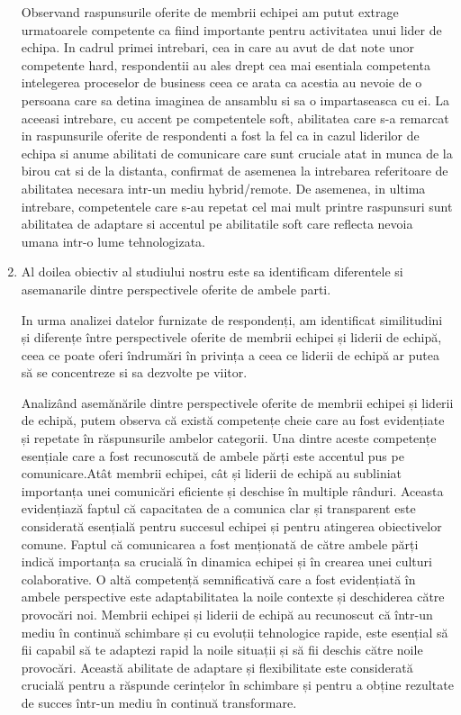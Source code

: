 \documentclass[a4paper, 12pt]{article}
\begin{document}
\begin{enumerate}[(1)]
	\quad Observand raspunsurile oferite de membrii echipei am putut extrage urmatoarele competente ca fiind importante pentru activitatea unui lider de echipa. In cadrul primei intrebari, cea in care au avut de dat note unor competente hard, respondentii au ales drept cea mai esentiala competenta intelegerea proceselor de business ceea ce arata ca acestia au nevoie de o persoana care sa detina imaginea de ansamblu si sa o impartaseasca cu ei. La aceeasi intrebare, cu accent pe competentele soft, abilitatea care s-a remarcat in raspunsurile oferite de respondenti a fost la fel ca in cazul liderilor de echipa si anume abilitati de comunicare care sunt cruciale atat in munca de la birou cat si de la distanta, confirmat de asemenea la intrebarea referitoare de abilitatea necesara intr-un mediu hybrid/remote. De asemenea, in ultima intrebare, competentele care s-au repetat cel mai mult printre raspunsuri sunt abilitatea de adaptare si accentul pe abilitatile soft care reflecta nevoia umana intr-o lume tehnologizata.

	\item Al doilea obiectiv al studiului nostru este sa identificam diferentele si asemanarile dintre perspectivele oferite de ambele parti.

	\quad In urma analizei datelor furnizate de respondenți, am identificat similitudini și diferențe între perspectivele oferite de membrii echipei și liderii de echipă, ceea ce poate oferi îndrumări în privința a ceea ce liderii de echipă ar putea să se concentreze si sa dezvolte pe viitor.

	\quad Analizând asemănările dintre perspectivele oferite de membrii echipei și liderii de echipă, putem observa că există competențe cheie care au fost evidențiate și repetate în răspunsurile ambelor categorii. Una dintre aceste competențe esențiale care a fost recunoscută de ambele părți este accentul pus pe comunicare.Atât membrii echipei, cât și liderii de echipă au subliniat importanța unei comunicări eficiente și deschise în multiple rânduri. Aceasta evidențiază faptul că capacitatea de a comunica clar și transparent este considerată esențială pentru succesul echipei și pentru atingerea obiectivelor comune. Faptul că comunicarea a fost menționată de către ambele părți indică importanța sa crucială în dinamica echipei și în crearea unei culturi colaborative. O altă competență semnificativă care a fost evidențiată în ambele perspective este adaptabilitatea la noile contexte și deschiderea către provocări noi. Membrii echipei și liderii de echipă au recunoscut că într-un mediu în continuă schimbare și cu evoluții tehnologice rapide, este esențial să fii capabil să te adaptezi rapid la noile situații și să fii deschis către noile provocări. Această abilitate de adaptare și flexibilitate este considerată crucială pentru a răspunde cerințelor în schimbare și pentru a obține rezultate de succes într-un mediu în continuă transformare.


\end{enumerate}
\end{document}
